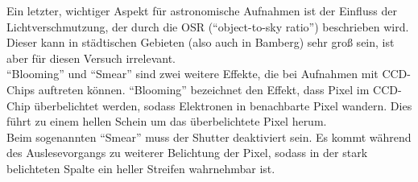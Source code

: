 \begin{comment}
Diese Formeln gelten entsprechend auch für den dark frame und das flat field.
Die praktische Anwendung zeigt sich, wenn man mehrere Bilder aufnimmt (um ein Mittel zu erzeugen). Die resultierende Signalstärke und Abweichung ergibt sich dann zu:
\begin{equation}
S_{combined} = \frac{N_{raw}S_{raw}}{N_{raw}} - \frac{N_{dark}S_{dark}}{N_{dark}} = S_{raw} - S_{dark}
\end{equation}
\begin{equation}
\sigma_{combined} = \sqrt{\frac{\sigma_{raw}^2}{N_{raw}} + \frac{\sigma_{dark}^2}{N_{dark}}}
\end{equation}
Man sieht, dass die Signalstärke nicht von der Anzahl $N$ der Aufnahmen abhängt, wohl aber die Abweichung. Je mehr Bilder man verwendet, desto kleiner wird die Abweichung, also wird die signal-to-noise ratio größer. Mit diesen Formeln kann man abschätzen, wie viele Aufnahmen angefertigt werden müssen, um eine gewünschte Bildqualität zu erhalten. Eine SNR von 3 liefert ein unklares und stark körniges Bild, während eine SNR von 30 bereits ein scharfes und deutliches Bild ergibt. Bei einer SNR von 100 kann man sogar kleine Details klar erkennen und Nebel- und Staubwolken gut sichtbar und scharf abbilden.
\\
Noch zu bedenken ist, dass durch die flat field - Korrektur zusätzliche Unsicherheit hinzukommt. Der Einfluss auf die resultierende Bildqualität ist wegen der sehr hohen SNR der flat field - Aufnahme jedoch üblicherweise vernachlässigbar, insbesondere anhand der enormen optischen Aufwertung des Bildes durch die Korrektur. Die resultierende SNR berechnet sich aus:
\begin{equation}
SNR_{result} = \frac{1}{\sqrt{\frac{1}{SNR_{image}^2} + \frac{1}{SNR_{flatfield}^2}}}
\end{equation}
\end{comment}
Ein letzter, wichtiger Aspekt für astronomische Aufnahmen ist der Einfluss der Lichtverschmutzung, der durch die OSR (\enquote{object-to-sky ratio}) beschrieben wird. Dieser kann in städtischen Gebieten (also auch in Bamberg) sehr groß sein, ist aber für diesen Versuch irrelevant.\\
\enquote{Blooming} und \enquote{Smear} sind zwei weitere Effekte, die bei Aufnahmen mit CCD-Chips auftreten können. 
\enquote{Blooming} bezeichnet den Effekt, dass Pixel im CCD-Chip überbelichtet werden, sodass Elektronen in benachbarte Pixel wandern. Dies führt zu einem hellen Schein um das überbelichtete Pixel herum. \\
Beim sogenannten \enquote{Smear} muss der Shutter deaktiviert sein. Es kommt während des Auslesevorgangs zu weiterer Belichtung der Pixel, sodass in der stark belichteten Spalte ein heller Streifen wahrnehmbar ist. 



